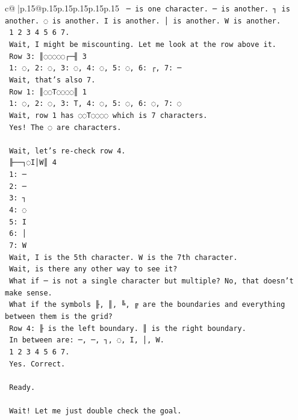 \documentclass{article}
\begin{document}
{\begin{supertabular}{c@{$\;$}|p{.15\linewidth}@{}p{.15\linewidth}p{.15\linewidth}p{.15\linewidth}p{.15\linewidth}p{.15\linewidth}}
{{{\texttt{    ─ is one character. ─ is another. ┐ is another. ◌ is another. I is another. │ is another. W is another.} \\
\texttt{    1 2 3 4 5 6 7.} \\
\texttt{    Wait, I might be miscounting. Let me look at the row above it.} \\
\texttt{    Row 3: ║◌◌◌◌◌┌─╢ 3} \\
\texttt{    1: ◌, 2: ◌, 3: ◌, 4: ◌, 5: ◌, 6: ┌, 7: ─} \\
\texttt{    Wait, that's also 7.} \\
\texttt{    Row 1: ║◌◌T◌◌◌◌║ 1} \\
\texttt{    1: ◌, 2: ◌, 3: T, 4: ◌, 5: ◌, 6: ◌, 7: ◌} \\
\texttt{    Wait, row 1 has ◌◌T◌◌◌◌ which is 7 characters.} \\
\texttt{    Yes! The ◌ are characters.} \\
\\ 
\texttt{    Wait, let's re{-}check row 4.} \\
\texttt{    ╟──┐◌I│W║ 4} \\
\texttt{    1: ─} \\
\texttt{    2: ─} \\
\texttt{    3: ┐} \\
\texttt{    4: ◌} \\
\texttt{    5: I} \\
\texttt{    6: │} \\
\texttt{    7: W} \\
\texttt{    Wait, I is the 5th character. W is the 7th character.} \\
\texttt{    Wait, is there any other way to see it?} \\
\texttt{    What if ─ is not a single character but multiple? No, that doesn't make sense.} \\
\texttt{    What if the symbols ╟, ║, ╚, ╔ are the boundaries and everything between them is the grid?} \\
\texttt{    Row 4: ╟ is the left boundary. ║ is the right boundary.} \\
\texttt{    In between are: ─, ─, ┐, ◌, I, │, W.} \\
\texttt{    1 2 3 4 5 6 7.} \\
\texttt{    Yes. Correct.} \\
\\ 
\texttt{    Ready.} \\
\\ 
\texttt{    Wait! Let me just double check the goal.} \\
}}}
\end{supertabular}}
\end{document}
